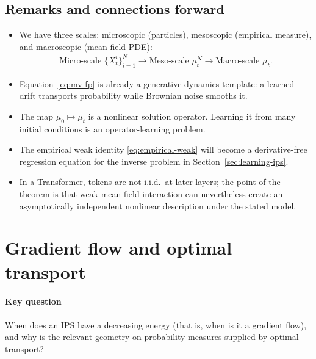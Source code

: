 \documentclass[11pt]{amsart}
\numberwithin{equation}{section}
\theoremstyle{plain}
\begin{document}
\subsection{Remarks and connections forward}
\begin{itemize}[leftmargin=*]
  \item We have three scales: microscopic (particles), mesoscopic (empirical measure), and macroscopic (mean-field PDE):
 \begin{align*}
   \text{Micro-scale }  \{X_t^i\}_{i=1}^N  \longrightarrow \text{Meso-scale }   \mu_t^N \longrightarrow \text{Macro-scale } \mu_t .
 \end{align*}

  \item Equation~\eqref{eq:mv-fp} is already a generative-dynamics template:
  a learned drift transports probability while Brownian noise smooths it.
  \item The map $\mu_0\mapsto\mu_t$ is a nonlinear solution operator.  Learning
  it from many initial conditions is an operator-learning problem.
  \item The empirical weak identity \eqref{eq:empirical-weak} will become a
  derivative-free regression equation for the inverse problem in
  Section~\ref{sec:learning-ips}.
  \item In a Transformer, tokens are not i.i.d.\ at later layers; the point of
  the theorem is that weak mean-field interaction can nevertheless create an
  asymptotically independent nonlinear description under the stated model.
\end{itemize}



\section{Gradient flow and optimal transport}\label{sec:gradient-flow}

\paragraph{\textbf{Key question}}
When does an IPS have a decreasing energy (that is, when is it a gradient
flow),
and why is the relevant geometry on probability measures supplied by optimal
transport?
\end{document}
